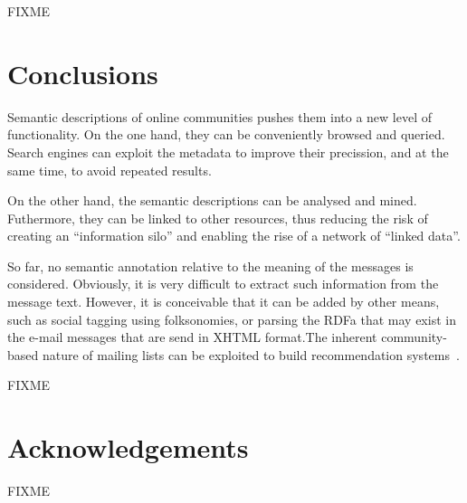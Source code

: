 \documentclass{../templates/www2008-submission}
\begin{document}
FIXME


\section{\label{sec:conclusions}Conclusions}

Semantic descriptions of online communities pushes them
into a new level of functionality. On the one hand, they can be
conveniently browsed and queried. Search engines can exploit the
metadata to improve their precission, and at the same time, to
avoid repeated results.

On the other hand, the semantic descriptions can be
analysed and mined. Futhermore, they can be linked to other resources,
thus reducing the risk of creating an ``information silo'' and
enabling the rise of a network of ``linked data''.

So far, no semantic annotation relative to the meaning of
the messages is considered. Obviously, it is very difficult
to extract such information from the message text.
However, it is conceivable that it can be added by other 
means, such as social tagging using folksonomies, or parsing the 
RDFa that may exist in the e-mail messages that are send in XHTML 
format.The inherent community-based nature of mailing lists can
be exploited to build recommendation systems~\cite{Celma2006}.

FIXME

\section*{Acknowledgements}

FIXME



 

\balancecolumns
\end{document}
